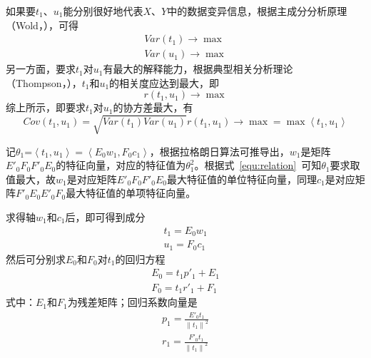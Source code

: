 如果要$t_1$、$u_1$能分别很好地代表$X$、$Y$中的数据变异信息，根据主成分分析原理（Wold，\citeyear{wold1987principal}），可得
\begin{align}
    \label{equ:variance1}
    Var({{t}_{1}})\to \max \\
    \label{equ:variance2}
    Var({{u}_{1}})\to \max
\end{align}
另一方面，要求$t_1$对$u_1$有最大的解释能力，根据典型相关分析理论（Thompson，\citeyear{thompson2005canonical}），$t_1$和$u_1$的相关度应达到最大，即
\begin{equation}
    \label{equ:relation}
    r({{t}_{1}},{{u}_{1}})\to \max 
\end{equation}
综上所示，即要求$t_1$对$u_1$的协方差最大，有
\begin{equation}
    \label{equ:relation}
    Cov({{t}_{1}},{{u}_{1}})=\sqrt{Var({{t}_{1}})Var({{u}_{1}})}r({{t}_{1}},{{u}_{1}})\to \max =\max \left\langle {{t}_{1}},{{u}_{1}} \right\rangle
\end{equation}

记${{\theta }_{1}}\text{=}\left\langle {{t}_{1}},{{u}_{1}} \right\rangle =\left\langle {{E}_{0}}{{w}_{1}},{{F}_{0}}{{c}_{1}} \right\rangle$，根据拉格朗日算法可推导出，$w_1$是矩阵${{{E}'}_{0}}{{F}_{0}}{{{F}'}_{0}}{{E}_{0}}$的特征向量，对应的特征值为$\theta _{1}^{2}$。根据式~\ref{equ:relation}~可知$\theta _{1}$要求取值最大，故$w_1$是对应矩阵${{{E}'}_{0}}{{F}_{0}}{{{F}'}_{0}}{{E}_{0}}$最大特征值的单位特征向量，同理$c_1$是对应矩阵${{{F}'}_{0}}{{E}_{0}}{{{E}'}_{0}}{{F}_{0}}$最大特征值的单项特征向量。

求得轴$w_1$和$c_1$后，即可得到成分
\begin{align}
    \label{equ:pc1}
    t_1={E_0}{w_1} \\
    \label{equ:pc2}
    u_1={F_0}{c_1}
\end{align}
然后可分别求$E_0$和$F_0$对$t_1$的回归方程
\begin{align}
    \label{equ:regress1}
    E_0={t_1}{p'_1}+E_1 \\
    \label{equ:regress2}
    F_0={t_1}{r'_1}+F_1
\end{align}
式中：$E_1$和$F_1$为残差矩阵；回归系数向量是
\begin{align}
    \label{equ:regress-index1}
    {{p}_{1}}=\frac{{{{{E}'}}_{0}}{{t}_{1}}}{{{\left\| {{t}_{1}} \right\|}^{2}}} \\
    \label{equ:regress-index2}
    {{r}_{1}}=\frac{{{{{F}'}}_{0}}{{t}_{1}}}{{{\left\| {{t}_{1}} \right\|}^{2}}}
\end{align}
    
